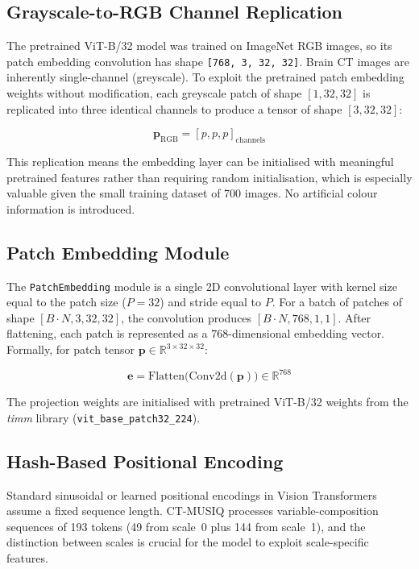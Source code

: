 \subsection{Grayscale-to-RGB Channel Replication}

The pretrained ViT-B/32 model was trained on ImageNet RGB images, so its patch embedding
convolution has shape \texttt{[768, 3, 32, 32]}. Brain CT images are inherently
single-channel (greyscale). To exploit the pretrained patch embedding weights without
modification, each greyscale patch of shape $[1, 32, 32]$ is replicated into three
identical channels to produce a tensor of shape $[3, 32, 32]$:

\begin{equation}
    \mathbf{p}_{\text{RGB}} = [p, p, p]_{\text{channels}}
\end{equation}

This replication means the embedding layer can be initialised with meaningful pretrained
features rather than requiring random initialisation, which is especially valuable given
the small training dataset of 700 images. No artificial colour information is introduced.

\subsection{Patch Embedding Module}

The \texttt{PatchEmbedding} module is a single 2D convolutional layer with kernel size
equal to the patch size ($P = 32$) and stride equal to $P$. For a batch of patches of
shape $[B \cdot N, 3, 32, 32]$, the convolution produces $[B \cdot N, 768, 1, 1]$.
After flattening, each patch is represented as a 768-dimensional embedding vector.
Formally, for patch tensor $\mathbf{p} \in \mathbb{R}^{3 \times 32 \times 32}$:

\begin{equation}
    \mathbf{e} = \text{Flatten}\bigl(\text{Conv2d}(\mathbf{p})\bigr) \in \mathbb{R}^{768}
\end{equation}

The projection weights are initialised with pretrained ViT-B/32 weights from the
\textit{timm} library (\texttt{vit\_base\_patch32\_224}).

\subsection{Hash-Based Positional Encoding}

Standard sinusoidal or learned positional encodings in Vision Transformers assume a
fixed sequence length. CT-MUSIQ processes variable-composition sequences of 193 tokens
(49 from scale~0 plus 144 from scale~1), and the distinction between scales is crucial
for the model to exploit scale-specific features.

